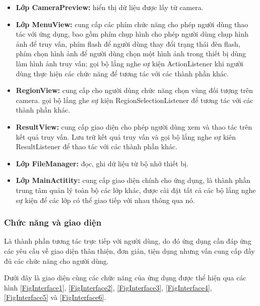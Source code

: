 \begin{itemize}
\item \textbf{Lớp CameraPreview:} hiển thị dữ liệu được lấy từ camera.

\item \textbf{Lớp MenuView:} cung cấp các phím chức năng cho phép người dùng thao tác với ứng dụng, bao gồm phím chụp hình cho phép người dùng chụp hình ảnh để truy vấn, phím flash để người dùng thay đổi trạng thái đèn flash, phím chọn hình ảnh để người dùng chọn một hình ảnh trong thiết bị dùng làm hình ảnh truy vấn; gọi bộ lắng nghe sự kiện ActionListener khi người dùng thực hiện các chức năng để tương tác với các thành phần khác.

\item \textbf{RegionView:} cung cấp cho người dùng chức năng chọn vùng đối tượng trên camera. gọi bộ lắng ghe sự kiện RegionSelectionListener để tương tác với các thành phần khác.

\item \textbf{ResultView:} cung cấp giao diện cho phép người dùng xem và thao tác trên kết quả truy vấn. Lưu trữ kết quả truy vấn và gọi bộ lắng nghe sự kiên ResultListener để thao tác với các thành phần khác.

\item \textbf{Lớp FileManager:} đọc, ghi dữ liệu từ bộ nhớ thiết bị.

\item \textbf{Lớp MainActitity:} cung cấp giao diện chính cho ứng dụng, là thành phần trung tâm quản lý toàn bộ các lớp khác, được cài đặt tất cả các bộ lắng nghe sự kiện để các lớp có thể giao tiếp với nhau thông qua nó.

\end{itemize}

\subsubsection{Chức năng và giao diện}
Là thành phần tương tác trực tiếp với người dùng, do đó ứng dụng cần đáp ứng các yêu cầu về giao diện thân thiện, đơn giản, tiện dụng nhưng vấn cung cấp đầy đủ các chức năng cho người dùng.

Dưới đây là giao diện cùng các chức năng của ứng dụng được thể hiện qua các hình \ref{FigInterface1}, \ref{FigInterface2}, \ref{FigInterface3}, \ref{FigInterface4}, \ref{FigInterface5} và \ref{FigInterface6}.

